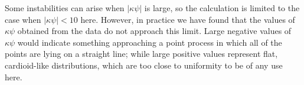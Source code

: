 \documentclass[../../ArchStats.tex]{subfiles}
\begin{document}
Some instabilities can arise when $\vert \kappa \psi \vert$ is large, so the calculation is limited to the case when $\vert \kappa \psi \vert < 10$ here. However, in practice we have found that the values of $\kappa \psi$ obtained from the data do not approach this limit. Large negative values of $\kappa \psi$ would indicate something approaching a point process in which all of the points are lying on a straight line; while large positive values represent flat, cardioid-like distributions, which are too close to uniformity to be of any use here.
\end{document}
